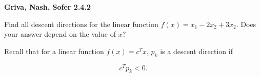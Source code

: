 \textbf{Griva, Nash, Sofer 2.4.2}

Find all descent directions for the linear function $f(x) = x_1 - 2x_2 + 3x_2$. Does your
answer depend on the value of $x$?

\begin{solution}
  Recall that for a linear function $f(x) = c^Tx$, $p_k$ is a descent direction if

  $$
    c^T p_k < 0.
  $$
  \ \\
\end{solution}
